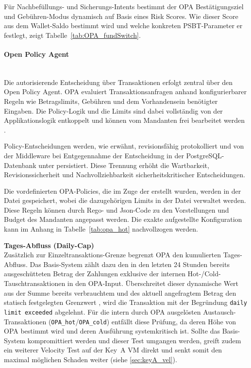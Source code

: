 Für Nachbefüllungs- und Sicherungs-Intents bestimmt der \ac{OPA} Bestätigungsziel und Gebühren-Modus dynamisch auf Basis eines Risk Scores.
Wie dieser Score aus dem Wallet-Saldo bestimmt wird und welche konkreten \ac{PSBT}-Parameter er festlegt, zeigt Tabelle~\ref{tab:OPA_fundSwitch}.

\paragraph{Open Policy Agent} \label{sec:opa} \mbox{}\\
Die autorisierende Entscheidung über Transaktionen erfolgt zentral über den Open Policy Agent. \ac{OPA} evaluiert Transaktionsanfragen anhand konfigurierbarer Regeln wie Betragslimits, Gebühren und dem Vorhandensein benötigter Eingaben. Die Policy-Logik und die Limits sind dabei vollständig von der Applikationslogik entkoppelt und können vom Mandanten frei bearbeitet werden \cite{opa_docs,opa_microservices}.

Policy-Entscheidungen werden, wie erwähnt, revisionsfähig protokolliert und von der Middleware bei Entgegennahme der Entscheidung in der PostgreSQL-Datenbank unter  persistiert.
Diese Trennung erhöht die Wartbarkeit, Revisionssicherheit und Nachvollziehbarkeit sicherheitskritischer Entscheidungen.

Die vordefinierten \ac{OPA}-Policies, die im Zuge der  erstellt wurden, werden in der Datei  gespeichert, wobei die dazugehörigen Limits in der Datei  verwaltet werden. Diese Regeln können durch Rego- und Json-Code zu den Vorstellungen und Budget des Mandanten angepasst werden. Die exakte aufgestellte Konfiguration kann im Anhang in Tabelle~\ref{tab:opa_hot} nachvollzogen werden.

\textbf{Tages-Abfluss (Daily-Cap)} \label{sec:OPA_vel}\\
Zusätzlich zur Einzeltransaktions-Grenze begrenzt \ac{OPA} den kumulierten Tages-Abfluss. Das Basis-System zählt dazu den in den letzten 24 Stunden bereits ausgeschütteten Betrag der Zahlungen exklusive der internen Hot-/Cold-Tauschtransaktionen in den \ac{OPA}-Input. Überschreitet dieser dynamische Wert aus der Summe bereits verbrauchtem und des aktuell angefragtem Betrag den statisch festgelegten Grenzwert \texttt{}, wird die Transaktion mit der Begründung \texttt{daily limit exceeded} abgelehnt. Für die intern durch \ac{OPA} ausgelösten Austausch-Transaktionen (\texttt{OPA\_hot}/\texttt{OPA\_cold}) entfällt diese Prüfung, da deren Höhe von OPA bestimmt wird und deren Ausführung systemkritisch ist.
Sollte das Basis-System kompromittiert werden und dieser Test umgangen werden, greift zudem ein weiterer Velocity Test auf der Key~A VM direkt und senkt somit den maximal möglichen Schaden weiter (siehe \ref{sec:keyA_vel}).

